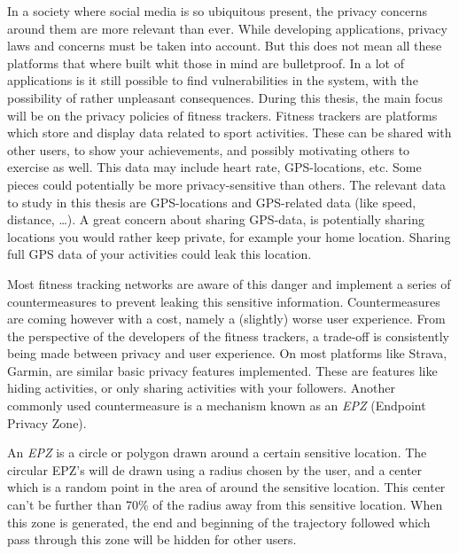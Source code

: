In a society where social media is so ubiquitous present, the privacy concerns
around them are more relevant than ever. While developing applications, privacy
laws and concerns must be taken into account. But this does not mean all these
platforms that where built whit those in mind are bulletproof. In a lot of
applications is it still possible to find vulnerabilities in the system, with
the possibility of rather unpleasant consequences. During this thesis, the main
focus will be on the privacy policies of fitness trackers. Fitness trackers are
platforms which store and display data related to sport activities. These can
be shared with other users, to show your achievements, and possibly motivating
others to exercise as well. This data may include heart rate, GPS-locations,
etc. Some pieces could potentially be more privacy-sensitive than others. The
relevant data to study in this thesis are GPS-locations and GPS-related data
(like speed, distance, \ldots). A great concern about sharing GPS-data, is
potentially sharing locations you would rather keep private, for example your
home location. Sharing full GPS data of your activities could leak this
location.

Most fitness tracking networks are aware of this danger and implement a series
of countermeasures to prevent leaking this sensitive information.
Countermeasures are coming however with a cost, namely a (slightly) worse user
experience. From the perspective of the developers of the fitness trackers, a
trade-off is consistently being made between privacy and user experience. On
most platforms like Strava, Garmin, are similar basic privacy features
implemented. These are features like hiding activities, or only sharing
activities with your followers. Another commonly used countermeasure is a
mechanism known as an \textit{EPZ} (Endpoint Privacy Zone).

An \textit{EPZ} is a circle or polygon drawn around a certain sensitive
location. The circular EPZ's will de drawn using a radius chosen by the user,
and a center which is a random point in the area of around the sensitive
location. This center can't be further than 70\% of the radius away from this
sensitive location. When this zone is generated, the end and beginning of the
trajectory followed which pass through this zone will be hidden for other
users.

